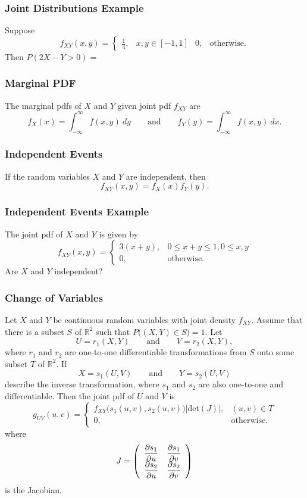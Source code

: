 \documentclass{beamer}
\begin{document}
\begin{frame}[t]
\frametitle{Joint Distributions Example}
\begin{Example}
\small
Suppose
$$
f_{XY}(x, y) = \begin{cases} \frac{1}{4},	&	x, y \in [-1, 1] &0, &	\text{otherwise.}\end{cases}
$$
Then $P(2X - Y > 0) = $
\end{Example}

\end{frame}

\begin{frame}
\frametitle{Marginal PDF}
The marginal pdfs of $X$ and $Y$ given joint pdf $f_{XY}$ are
$$
f_X(x) = \int_{-\infty}^\infty f(x,y)\ dy\qquad\text{and}\qquad f_Y(y) = \int_{-\infty}^\infty f(x, y)\ dx.
$$
\end{frame}

\begin{frame}
\frametitle{Independent Events}
If the random variables $X$ and $Y$ are independent, then
$$
f_{XY}(x, y) = f_X(x) f_Y(y).
$$
\end{frame}

\begin{frame}[t]
\frametitle{Independent Events Example}
\small
\begin{Example}
The joint pdf of $X$ and $Y$ is given by
$$
f_{XY}(x, y) = \begin{cases} 3(x + y),&	0\leq x +y \leq 1, 0 \leq x, y\\ 0, & \text{otherwise.}\end{cases}	
$$
Are $X$ and $Y$ independent? 
\end{Example}

\end{frame}

\begin{frame}
\frametitle{Change of Variables}
\tiny
\begin{Theorem}
Let $X$ and $Y$ be continuous random variables with joint density $f_{XY}$. Assume that there is a subset $S$ of $\mathbb{R}^2$ such that
$P\Big((X, Y)\in S\Big) = 1$. Let 
$$
U = r_1(X, Y)\qquad\text{and}\qquad V = r_2(X, Y),
$$ 
where $r_1$ and $r_2$ are one-to-one differentiable transformations from $S$ onto some subset $T$ of $\mathbb{R}^2$. If 
$$
X = s_1(U, V)\qquad\text{and}\qquad Y = s_2(U, V)
$$ 
describe the inverse transformation, where $s_1$ and $s_2$ are also one-to-one and differentiable. Then the joint pdf of $U$ and $V$ is
$$
g_{UV}(u, v) = \begin{cases} f_{XY}\Big(s_1(u, v), s_2(u, v)\Big)\left|\text{det}(J)\right|,	&	(u, v)\in T\\ 0,&	\text{otherwise.}\end{cases}
$$
where 
$$
J = \left(\begin{array}{c c} \dfrac{\partial s_1}{\partial u}	&	\dfrac{\partial s_1}{\partial v}\\ \dfrac{\partial s_2}{\partial u}	&	\dfrac{\partial s_2}{\partial v}\end{array}\right)
$$
is the Jacobian.
\end{Theorem}

\end{frame}
\end{document}
